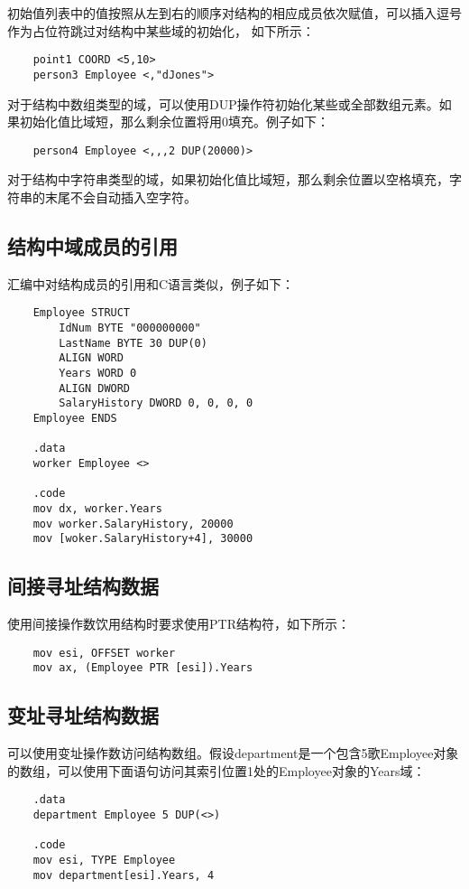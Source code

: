 \documentclass[a4paper,left=2.5cm,right=2.5cm,11pt]{article}
\begin{document}
	初始值列表中的值按照从左到右的顺序对结构的相应成员依次赋值，可以插入逗号作为占位符跳过对结构中某些域的初始化，
	如下所示：
	\begin{lstlisting}
	point1 COORD <5,10>
	person3 Employee <,"dJones">
	\end{lstlisting}

	对于结构中数组类型的域，可以使用DUP操作符初始化某些或全部数组元素。如果初始化值比域短，那么剩余位置将用0填充。例子如下：
	\begin{lstlisting}
	person4 Employee <,,,2 DUP(20000)>
	\end{lstlisting}

	对于结构中字符串类型的域，如果初始化值比域短，那么剩余位置以空格填充，字符串的末尾不会自动插入空字符。

\subsection{结构中域成员的引用}
	汇编中对结构成员的引用和C语言类似，例子如下：
	\begin{lstlisting}
	Employee STRUCT
		IdNum BYTE "000000000"
		LastName BYTE 30 DUP(0)
		ALIGN WORD
		Years WORD 0
		ALIGN DWORD
		SalaryHistory DWORD 0, 0, 0, 0
	Employee ENDS

	.data
	worker Employee <>

	.code
	mov dx, worker.Years
	mov worker.SalaryHistory, 20000
	mov [woker.SalaryHistory+4], 30000
	\end{lstlisting}

\subsection{间接寻址结构数据}
	使用间接操作数饮用结构时要求使用PTR结构符，如下所示：
	\begin{lstlisting}
	mov esi, OFFSET worker
	mov ax, (Employee PTR [esi]).Years
	\end{lstlisting}

\subsection{变址寻址结构数据}
	可以使用变址操作数访问结构数组。假设department是一个包含5歌Employee对象的数组，可以使用下面语句访问其索引位置1处的Employee对象的Years域：
	\begin{lstlisting}
	.data
	department Employee 5 DUP(<>)

	.code
	mov esi, TYPE Employee
	mov department[esi].Years, 4
	\end{lstlisting}
\end{document}
